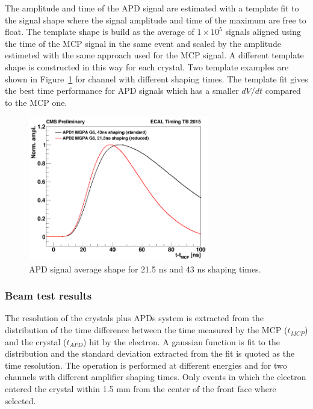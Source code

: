 The amplitude and time of the APD signal are estimated with a template fit to the signal shape where the signal
amplitude and time of the maximum are free to float.
The template shape is build as the average of $1\times 10^5$ signals aligned using the time of the MCP signal
in the same event and scaled by the amplitude estimeted with the same approach used for the MCP signal.
A different template shape is constructed in this way
for each crystal. Two template examples are shown in Figure~\ref{fig:apd_templates} for channel with different  
shaping times. The template fit gives the best time performance for APD signals which has a smaller $dV/dt$ compared
to the MCP one.

\begin{figure}
  \centering
  \includegraphics[width = 0.7\textwidth]{figures/upgrade/wf_shaping_times.png}
  \caption{APD signal average shape for 21.5 ns and 43 ns shaping times.}
  \label{fig:apd_templates}
\end{figure}

\subsubsection{Beam test results}
\label{sec:tb_2015_results}
The resolution of the \PbWO crystals plus APDs system is extracted from 
the distribution of the time difference between the time measured by the MCP ($t_{MCP}$) and the crystal ($t_{APD}$)
hit by the electron.
A gaussian function is fit to the distribution and the standard deviation extracted from the fit is quoted as
the time resolution. The operation is performed at different energies and for two channels with different
amplifier shaping times. Only events in which the electron entered the crystal within 1.5 mm from the center of the
front face where selected. 

